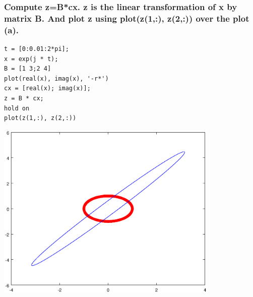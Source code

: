 \documentclass[12pt,a4paper]{article}
\begin{document}
\subsubsection{Compute z=B*cx.  z is the linear transformation of x by matrix B.  And plot z using plot(z(1,:), z(2,:)) over the plot (a).} 
\begin{lstlisting}
t = [0:0.01:2*pi];
x = exp(j * t);
B = [1 3;2 4]
plot(real(x), imag(x), '-r*')
cx = [real(x); imag(x)];
z = B * cx;
hold on
plot(z(1,:), z(2,:))
\end{lstlisting}
\includegraphics[width=0.8\textwidth]{5.eps}
\end{document}

